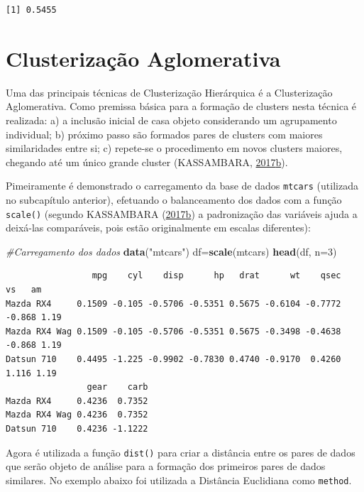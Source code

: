 \documentclass[12pt,brazil,oneside]{book}
\newenvironment{Shaded}{\begin{snugshade}}{\end{snugshade}}
\newcommand{\CommentTok}[1]{\textcolor[rgb]{0.56,0.35,0.01}{\textit{#1}}}
\newcommand{\DataTypeTok}[1]{\textcolor[rgb]{0.13,0.29,0.53}{#1}}
\newcommand{\DecValTok}[1]{\textcolor[rgb]{0.00,0.00,0.81}{#1}}
\newcommand{\KeywordTok}[1]{\textcolor[rgb]{0.13,0.29,0.53}{\textbf{#1}}}
\newcommand{\NormalTok}[1]{#1}
\newcommand{\StringTok}[1]{\textcolor[rgb]{0.31,0.60,0.02}{#1}}
\begin{document}
\begin{verbatim}
[1] 0.5455
\end{verbatim}

\hypertarget{clusterizacao-aglomerativa}{%
\section{Clusterização Aglomerativa}\label{clusterizacao-aglomerativa}}

Uma das principais técnicas de Clusterização Hierárquica é a Clusterização Aglomerativa. Como premissa básica para a formação de clusters nesta técnica é realizada: a) a inclusão inicial de casa objeto considerando um agrupamento individual; b) próximo passo são formados pares de clusters com maiores similaridades entre si; c) repete-se o procedimento em novos clusters maiores, chegando até um único grande cluster (KASSAMBARA, \protect\hyperlink{ref-Kassambara2017}{2017}\protect\hyperlink{ref-Kassambara2017}{b}).

Pimeiramente é demonstrado o carregamento da base de dados \texttt{mtcars} (utilizada no subcapítulo anterior), efetuando o balanceamento dos dados com a função \texttt{scale()} (segundo KASSAMBARA (\protect\hyperlink{ref-Kassambara2017}{2017}\protect\hyperlink{ref-Kassambara2017}{b}) a padronização das variáveis ajuda a deixá-las comparáveis, pois estão originalmente em escalas diferentes):

\begin{Shaded}
\begin{Highlighting}[]
\CommentTok{#Carregamento dos dados}
\KeywordTok{data}\NormalTok{(}\StringTok{"mtcars"}\NormalTok{)}
\NormalTok{df=}\KeywordTok{scale}\NormalTok{(mtcars)}
\KeywordTok{head}\NormalTok{(df, }\DataTypeTok{n=}\DecValTok{3}\NormalTok{)}
\end{Highlighting}
\end{Shaded}

\begin{verbatim}
                 mpg    cyl    disp      hp   drat      wt    qsec     vs   am
Mazda RX4     0.1509 -0.105 -0.5706 -0.5351 0.5675 -0.6104 -0.7772 -0.868 1.19
Mazda RX4 Wag 0.1509 -0.105 -0.5706 -0.5351 0.5675 -0.3498 -0.4638 -0.868 1.19
Datsun 710    0.4495 -1.225 -0.9902 -0.7830 0.4740 -0.9170  0.4260  1.116 1.19
                gear    carb
Mazda RX4     0.4236  0.7352
Mazda RX4 Wag 0.4236  0.7352
Datsun 710    0.4236 -1.1222
\end{verbatim}

Agora é utilizada a função \texttt{dist()} para criar a distância entre os pares de dados que serão objeto de análise para a formação dos primeiros pares de dados similares. No exemplo abaixo foi utilizada a Distância Euclidiana como \texttt{method}.
\end{document}
